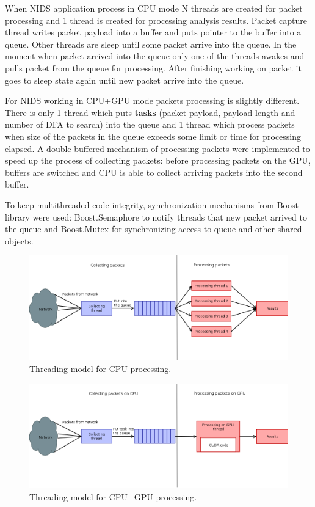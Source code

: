 \documentclass[thesis=M,english]{FITthesis}[2011/07/15]
\begin{document}
When NIDS application process in CPU mode N threads are created for packet processing and 1 thread is created for processing analysis results. Packet capture thread writes packet payload into a buffer and puts pointer to the buffer into a queue. Other threads are sleep until some packet arrive into the queue. In the moment when packet arrived into the queue only one of the threads awakes and pulls packet from the queue for processing. After finishing working on packet it goes to sleep state again until new packet arrive into the queue.

For NIDS working in CPU+GPU mode packets processing is slightly different. There is only 1 thread which puts \textbf{tasks} (packet payload, payload length and number of DFA to search) into the queue and 1 thread which process packets when size of the packets in the queue exceeds some limit or time for processing elapsed. A double-buffered mechanism of processing packets were implemented to speed up the process of collecting packets: before processing packets on the GPU, buffers are switched and CPU is able to collect arriving packets into the second buffer.

To keep multithreaded code integrity, synchronization mechanisms from Boost library were used: Boost.Semaphore to notify threads that new packet arrived to the queue and Boost.Mutex for synchronizing access to queue and other shared objects.

\begin{figure}
\centering
\includegraphics[scale=0.3]{images/cpu_threads.png}
\caption{Threading model for CPU processing.}
\label{fig:cpu_threads}
\end{figure}

\begin{figure}
\centering
\includegraphics[scale=0.3]{images/gpu_threads.png}
\caption{Threading model for CPU+GPU processing.}
\label{fig:gpu_threads}
\end{figure}
\end{document}
